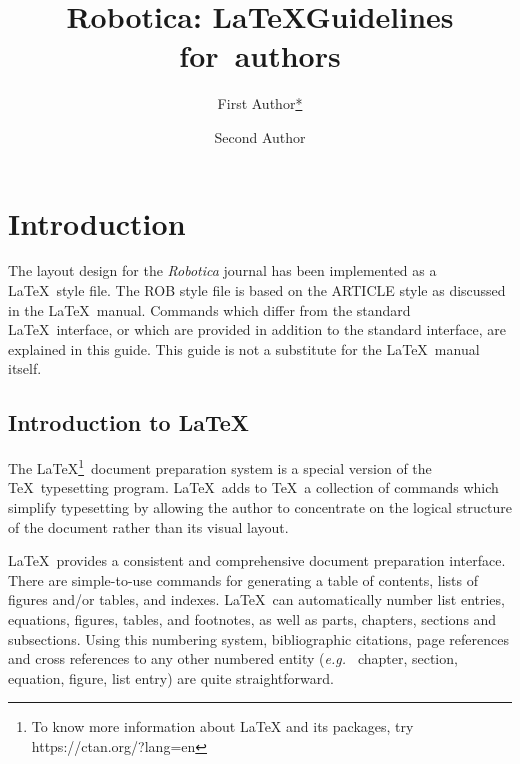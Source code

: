 \documentclass[DTMColor]{ROB-New}
\begin{document}



\title{Robotica: \LaTeX Guidelines for~authors}

\author[1]{First Author\hyperlink{corr}{*}}
\address[1]{Affiliation 1, Country}

\author[2]{ Second Author}
\address[2]{Affiliation 2, Country}
\address{\hypertarget{corr}{*}Corresponding author. }




\maketitle

\section{Introduction}

The layout design for the {\em Robotica} journal
has been implemented as a \LaTeX\ style file. The ROB style file is based
on the ARTICLE style as discussed in the \LaTeX\ manual. Commands which
differ from the standard \LaTeX\ interface, or which are provided in addition
to the standard interface, are explained in this guide. This guide is not a
substitute for the \LaTeX\ manual itself.

\subsection{Introduction to \LaTeX}

The \LaTeX\footnote{To know more information about LaTeX and its packages, try https://ctan.org/?lang=en}\ document preparation system is a special version of the
\TeX\ typesetting program. \LaTeX\ adds to \TeX\ a collection of
commands which simplify typesetting by allowing the author to
concentrate on the logical structure of the document rather than
its visual layout.

\LaTeX\ provides a consistent and comprehensive document preparation
interface. There are simple-to-use commands for generating a table of
contents, lists of figures and/or tables, and indexes. \LaTeX\ can
automatically number list entries, equations, figures, tables, and
footnotes, as well as parts, chapters, sections and subsections.
Using this numbering system, bibliographic citations, page references
and cross references to any other numbered entity ({\it e.g.\ } chapter,
section, equation, figure, list entry) are quite straightforward.
\end{document}
